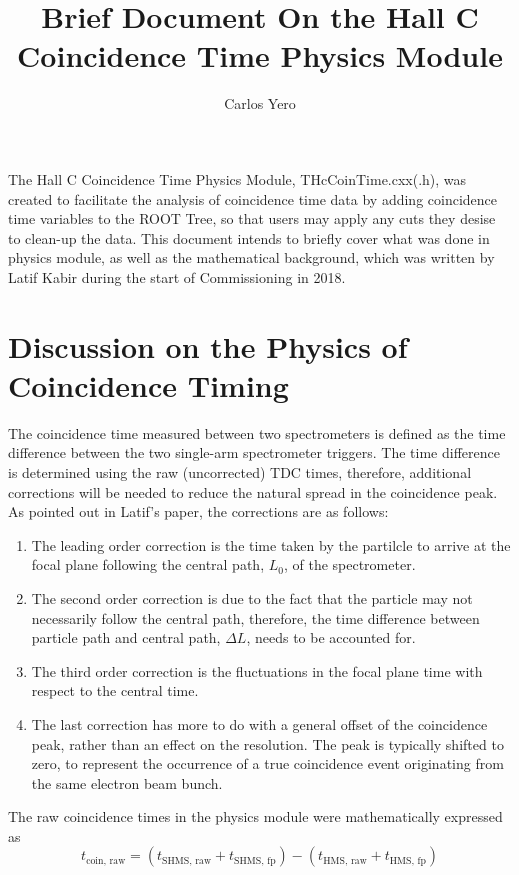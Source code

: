 \documentclass[14pt]{article}
\begin{document}
 
 
\title{\textbf{Brief Document On the Hall C Coincidence Time Physics Module}}%
\author{Carlos Yero} %
 
\maketitle
\noindent The Hall C Coincidence Time Physics Module, THcCoinTime.cxx(.h), was created to facilitate the analysis of
coincidence time data by adding coincidence time variables to the ROOT Tree, so that users may apply any
cuts they desise to clean-up the data. This document intends to briefly cover what was done in physics module,
as well as the mathematical background, which was written by Latif Kabir during the start of Commissioning in 2018.\\

\section{Discussion on the Physics of Coincidence Timing}
The coincidence time measured between two spectrometers is defined as the time difference between the
two single-arm spectrometer triggers. The time difference is determined using the raw (uncorrected) TDC times,
therefore, additional corrections will be needed to reduce the natural spread in the coincidence peak.
As pointed out in Latif's paper, the corrections are as follows:
\begin{enumerate}
\item The leading order correction is the time taken by the partilcle to arrive at the focal plane following the
  central path, $L_{0}$, of the spectrometer.
\item The second order correction is due to the fact that the particle may not necessarily follow the central path, therefore,
  the time difference between particle path and central path, $\Delta L$, needs to be accounted for.
\item The third order correction is the fluctuations in the focal plane time with respect to the central time.
\item The last correction has more to do with a general offset of the coincidence peak, rather than an effect on the
  resolution. The peak is typically shifted to zero, to represent the occurrence of a true coincidence event originating
  from the same electron beam bunch.
\end{enumerate}
The raw coincidence times in the physics module were mathematically expressed as
\begingroup
\normalsize
\begin{equation}\label{eq1}
t_{\text{coin, raw}} = (t_{\text{SHMS, raw}} + t_{\text{SHMS, fp}}) - (t_{\text{HMS, raw}} + t_{\text{HMS, fp}})
\end{equation}
\endgroup
\end{document}
